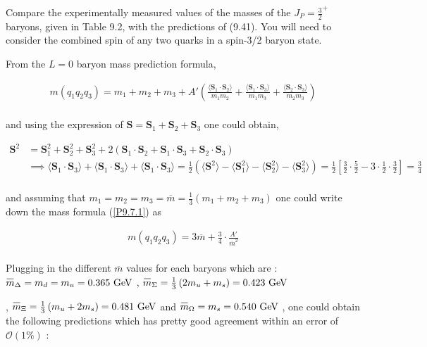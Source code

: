 \begin{problem}{9.7}
Compare the experimentally measured values of the masses of the $J_P = \frac{3}{2}^+ $ baryons, given in Table 9.2, with the predictions of (9.41). You will need to consider the combined spin of any two quarks in a spin-3/2 baryon state.
\end{problem}
\begin{solution}
From the $L=0$ baryon mass prediction formula, 

\begin{align} \label{P9.7.1}
    m(q_1q_2q_3) = m_1 + m_2 + m_3 + A' \left( \frac{\langle \mathbf{S}_1 \cdot \mathbf{S}_2 \rangle}{m_1m_2} + \frac{\langle \mathbf{S}_1 \cdot \mathbf{S}_3 \rangle}{m_1m_3} + \frac{\langle \mathbf{S}_2 \cdot \mathbf{S}_3 \rangle}{m_2m_3}\right)
\end{align}\\
and using the expression of $\mathbf{S}=\mathbf{S}_1 + \mathbf{S}_2 + \mathbf{S}_3$ one could obtain,

\begin{align*}
    \mathbf{S}^2 &= \mathbf{S}_1^2 + \mathbf{S}_2^2 + \mathbf{S}_3^2 + 2 \left( \mathbf{S}_1 \cdot \mathbf{S}_2 + \mathbf{S}_1 \cdot \mathbf{S}_3 + \mathbf{S}_2 \cdot \mathbf{S}_3  \right) \\[0.12in]
    &\implies \langle \mathbf{S}_1 \cdot \mathbf{S}_3 \rangle + \langle \mathbf{S}_1 \cdot \mathbf{S}_3 \rangle + \langle \mathbf{S}_1 \cdot \mathbf{S}_3 \rangle = \frac{1}{2} \left( \langle \mathbf{S}^2 \rangle - \langle \mathbf{S}_1^2 \rangle  - \langle \mathbf{S}_2^2 \rangle  - \langle \mathbf{S}_3^2 \rangle \right) = \frac{1}{2} \left[ \frac{3}{2}\cdot \frac{5}{2} - 3\cdot \frac{1}{2}\cdot \frac{3}{2} \right] = \frac{3}{4}
\end{align*}\\
and assuming that $m_1 = m_2 = m_3 = \overbar{m} = \frac{1}{3}\left( m_1 + m_2 + m_3 \right)$ one could write down the mass formula (\ref{P9.7.1}) as 

\begin{align*}
    m(q_1q_2q_3) = 3 \overbar{m} + \frac{3}{4}\cdot \frac{A'}{\overbar{m}^2}
\end{align*}\\
Plugging in the different $\overbar{m}$ values for each baryons which are : $\overbar{m}_\Delta = m_d = m_u = 0.365 \GeV$ , $\overbar{m}_\Sigma = \frac{1}{3} \left( 2m_u + m_s \right) = 0.423 \GeV$
\end{solution} , $\overbar{m}_\Xi = \frac{1}{3} \left( m_u + 2m_s \right) = 0.481 \GeV$ and $\overbar{m}_\Omega = m_s = 0.540 \GeV$ , one could obtain the following predictions which has pretty good agreement within an error of $\mathcal{O}(1\%)$ :

